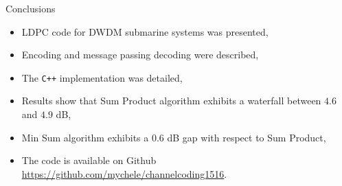 \documentclass[pdf]
          {beamer}
\begin{document}
\begin{frame}{Conclusions}
    \begin{itemize}
    	\item LDPC code for DWDM submarine systems was presented,
 		\item Encoding and message passing decoding were described,
 		\item The \texttt{C++} implementation was detailed,
 		\item Results show that Sum Product algorithm exhibits a waterfall between $4.6$ and $4.9$ dB,
 		\item Min Sum algorithm exhibits a $0.6$ dB gap with respect to Sum Product,
 		\item The code is available on Github \url{https://github.com/mychele/channelcoding1516}.
	\end{itemize}
\end{frame}

\begin{frame}
    \titlepage
\end{frame}
\end{document}
